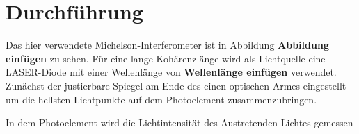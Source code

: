 \section{Durchführung}
Das hier verwendete Michelson-Interferometer ist in Abbildung \textbf{Abbildung einfügen} zu sehen.
Für eine lange Kohärenzlänge wird als Lichtquelle eine LASER-Diode mit einer Wellenlänge von \textbf{Wellenlänge einfügen} verwendet. 
Zunächst der justierbare Spiegel am Ende des einen optischen Armes eingestellt um die hellsten Lichtpunkte auf dem Photoelement zusammenzubringen.

In dem Photoelement wird die Lichtintensität des Austretenden Lichtes gemessen
